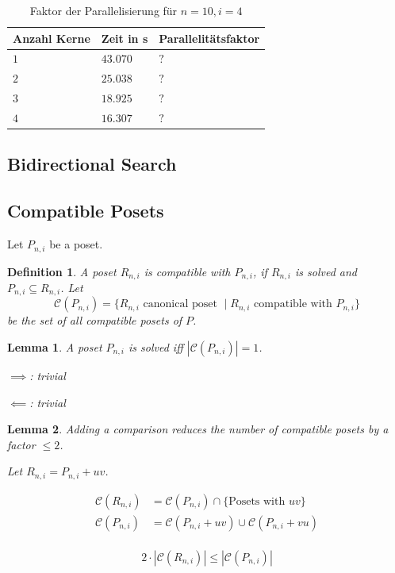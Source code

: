 \documentclass[10pt,journal,compsoc]{IEEEtran}
\newtheorem{lemma}{Lemma}
\newtheorem{definition}{Definition}
\begin{document}
\begin{table}
  \begin{tabular}{l|l|l}
    Anzahl Kerne & Zeit in s & Parallelitätsfaktor \\
    \hline
    $1$          & $43.070$  & $?$                 \\ %
    $2$          & $25.038$  & $?$                 \\
    $3$          & $18.925$  & $?$                 \\
    $4$          & $16.307$  & $?$                 \\
  \end{tabular}
  \centering
  \caption{Faktor der Parallelisierung für $n = 10, i = 4$}
  \label{table:backward-parallel}
\end{table}


\subsection{Bidirectional Search}

\subsection{Compatible Posets}

Let $P_{n,i}$ be a poset.
\begin{definition}
  A poset $R_{n,i}$ is compatible with $P_{n,i}$, if $R_{n,i}$ is solved and $P_{n,i} \subseteq R_{n,i}$.
  Let $$\mathcal{C}(P_{n,i}) = \{ R_{n,i} \text{ canonical poset } \mid R_{n,i} \text{ compatible with } P_{n,i} \}$$ be the set of all compatible posets of $P$.
\end{definition}

\begin{lemma}
  A poset $P_{n,i}$ is solved iff $|\mathcal{C}(P_{n,i})| = 1$.

  $\implies$: trivial

  $\impliedby$: trivial
\end{lemma}

\begin{lemma}
  Adding a comparison reduces the number of compatible posets by a factor $\leq 2$.

  Let $R_{n,i} = P_{n,i} + uv$.

  \begin{align*}
    \mathcal{C}(R_{n,i}) & = \mathcal{C}(P_{n,i}) \cap \{ \text{Posets with } uv \}   \\
    \mathcal{C}(P_{n,i}) & = \mathcal{C}(P_{n,i} + uv) \cup \mathcal{C}(P_{n,i} + vu) \\
  \end{align*}

  $$2 \cdot |\mathcal{C}(R_{n,i})| \leq |\mathcal{C}(P_{n,i})|$$
\end{lemma}
\end{document}

